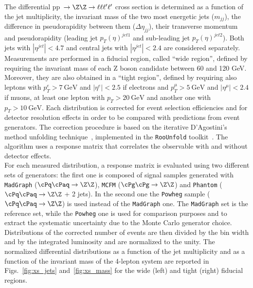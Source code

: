 The differential pp~$\to \Z\Z\to \ell\ell\ell'\ell'$ cross section is determined as a function of the jet multiplicity, the invariant mass of the two most energetic jets ($m_{jj}$), the 
difference in pseudorapidity between them ($\Delta\eta_{jj}$), their transverse momentum and pseudorapidity 
(leading jet $p_{T}(\eta)^{jet1}$ and sub-leading jet $p_{T}(\eta)^{jet2}$). Both jets with  $|\eta^{jet}|<4.7$ and 
central jets with $|\eta^{jet}|<2.4$ are considered separately. Measurements are performed in a fiducial region, called ``wide region'',  defined by requiring the invariant mass of each Z boson candidate between 60 and 120 GeV. Moreover, they are also obtained in a ``tight region'', defined by requiring also leptons with $p^e_T > 7~\mathrm{GeV}$ and $|\eta^e| < 2.5$ if electrons and $p^{\mu}_T > 5~\mathrm{GeV}$ and $|\eta^{\mu}| < 2.4$ if muons, at least one lepton with $p_T > 20~\mathrm{GeV}$ and another one with $p_T > 10~\mathrm{GeV}$.
Each distribution is corrected for event selection efficiencies and for detector resolution effects in order to be 
compared with predictions from event generators. The correction procedure is based on the iterative D'Agostini's method unfolding technique~\cite{DAgostini}, implemented in the \texttt{RooUnfold} toolkit~\cite{RooUnfold}. The algorithm uses a response matrix that correlates the observable with and without detector effects.\\
For each measured distribution, a response matrix is evaluated using two different sets of generators: the first 
one is composed of signal samples generated with \texttt{MadGraph} ($\cPq\cPaq \to \Z\Z$), \texttt{MCFM} ($\cPg\cPg \to \Z\Z$) 
and \texttt{Phantom} ($\cPq\cPaq \to \Z\Z$ + 2 jets). In the second one the \texttt{Powheg} sample ($\cPq\cPaq \to \Z\Z$) is used 
instead of the \texttt{MadGraph} one. The \texttt{MadGraph} set is the reference set, while the  \texttt{Powheg} 
one is used for comparison purposes and to extract the systematic uncertainty due to the Monte Carlo generator choice. \\
Distributions of the corrected number of events are then divided by the bin width and by the integrated luminosity and are normalized to the unity. The normalized differential distributions as a function of the jet multiplicity and as a function of the invariant mass of the 4-lepton system are reported in Figs.~\ref{fig:xs_jets} and~\ref{fig:xs_mass} for the wide (left) and tight (right) fiducial regions.
